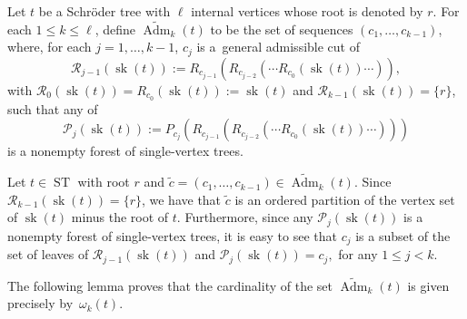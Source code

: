 \documentclass[pdftex]{sigma}%
\numberwithin{equation}{section}
\newcommand{\ST}{\operatorname{ST}}
\newcommand{\cR}{\mathcal{R}}
\newcommand{\ccP}{\mathcal{P}}
\newcommand{\sk}{\operatorname{sk}}
\newcommand{\AdmT}{\widetilde{\operatorname{Adm}}}
\begin{document}
Let $t$ be a Schr\"oder tree with $\ell$ internal vertices whose root is denoted by $r$. For each $1\leq k\leq \ell$, define $\AdmT_k(t)$ to be the set of sequences $(c_1,\dots,c_{k-1})$, where, for each $j=1,\dots,k-1$, $c_j$ is a~general admissible cut of
\[
	\cR_{j-1}(\sk(t)) := R_{c_{j-1}}(R_{c_{j-2}}(\cdots R_{c_0}(\sk(t))\cdots)),
\]
with $\cR_0(\sk(t))=R_{c_0}(\sk(t)) := \sk(t)$ and $\cR_{k-1}(\sk(t)) =\{r\}$, such that any of
\[
	\ccP_{j}(\sk(t)):=P_{c_j}(R_{c_{j-1}}(R_{c_{j-2}}(\cdots R_{c_0}(\sk(t))\cdots)))
\]
is a nonempty forest of single-vertex trees.

\begin{Remark}Let $t\in \ST$ with root $r$ and $\tilde{c}= (c_1,\dots,c_{k-1})\!\in\! \AdmT_k(t)$. Since \mbox{$\cR_{k-1}(\sk(t)) = \{r\}$}, we have that $\tilde{c}$ is an ordered partition of the vertex set of $\sk(t)$ minus the root of $t$. Furthermore, since any $\ccP_j(\sk(t))$ is a nonempty forest of single-vertex trees, it is easy to see that $c_j$ is a subset of the set of leaves of $\cR_{j-1}(\sk(t))$ and $ \ccP_j(\sk(t)) = c_j,$ for any $1\leq j <k$.
\end{Remark}

The following lemma proves that the cardinality of the set $\AdmT_k(t)$ is given precisely by~$\omega_k(t)$.
\end{document}
